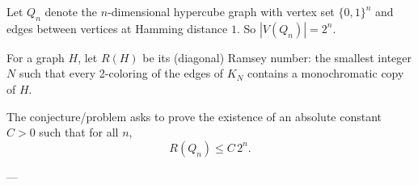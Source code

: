 Let $Q_n$ denote the $n$-dimensional hypercube graph with vertex set $\{0,1\}^n$ and edges between vertices at Hamming distance $1$.
So $|V(Q_n)|=2^n$.

For a graph $H$, let $R(H)$ be its (diagonal) Ramsey number: the smallest integer $N$ such that every 2-coloring of the edges of $K_N$ contains a monochromatic copy of $H$.

The conjecture/problem asks to prove the existence of an absolute constant $C>0$ such that for all $n$,
\[
R(Q_n)\le C\,2^n.
\]

---
